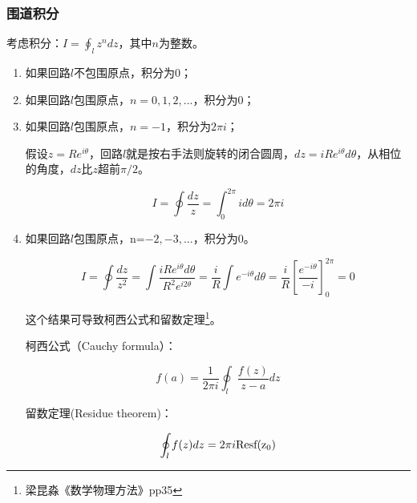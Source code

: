 \subsubsection{围道积分}


考虑积分：$I = \oint_{l} z^n dz$，其中$n$为整数。

\begin{enumerate}
  \item 如果回路$l$不包围原点，积分为$0$；

  \item 如果回路$l$包围原点，$n=0,1,2,...$，积分为$0$；

  \item 如果回路$l$包围原点，$n=-1$，积分为$2\pi i$；

假设$z=Re^{i \theta}$，回路$l$就是按右手法则旋转的闭合圆周，$dz = i
R e^{i \theta} d \theta$，从相位的角度，$dz$比$z$超前$\pi /2$。

\begin{equation*}
 I=\oint \frac{dz}{z} = \int_{0}^{2 \pi} i d \theta =2 \pi i
\end{equation*}


\item 如果回路$l$包围原点，n=$-2,-3,...$，积分为$0$。


\begin{equation*}
 I=\oint \frac{dz}{z^2} = \int \frac{iRe^{i
\theta}d\theta}{R^2e^{i2\theta}}=\frac{i}{R}\int e^{-i\theta}d\theta
= \frac{i}{R}[\frac{e^{-i \theta}}{-i}]_0^{2 \pi} =0
\end{equation*}


这个结果可导致柯西公式和留数定理\footnote{梁昆淼《数学物理方法》pp35}。

柯西公式（Cauchy formula）：


\begin{equation*}
 f(a) = \frac{1}{2\pi i} \oint_l \frac{f(z)}{z-a}dz
\end{equation*}

留数定理(Residue theorem)：


\begin{equation*}
 \oint_l f(z)dz = 2 \pi i \rm{Res}f(z_0)
\end{equation*}


\end{enumerate}


